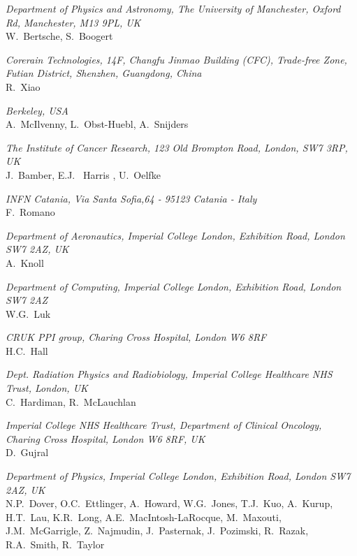 \vspace{0.5cm}
\noindent \textit{Department of Physics and Astronomy, The University of Manchester, Oxford Rd, Manchester, M13 9PL, UK} \\
W.~Bertsche, S.~Boogert
 
\vspace{0.5cm}
\noindent \textit{Corerain Technologies, 14F, Changfu Jinmao Building (CFC), Trade-free Zone, Futian District, Shenzhen, Guangdong, China} \\
R.~Xiao
 
\vspace{0.5cm}
\noindent \textit{Berkeley, USA} \\
A.~McIlvenny, L.~Obst-Huebl, A.~Snijders
 
\vspace{0.5cm}
\noindent \textit{The Institute of Cancer Research, 123 Old Brompton Road, London, SW7 3RP, UK} \\
J.~Bamber, E.J. ~Harris , U.~Oelfke
 
\vspace{0.5cm}
\noindent \textit{INFN Catania, Via Santa Sofia,64 - 95123 Catania - Italy} \\
F.~Romano
 
\vspace{0.5cm}
\noindent \textit{Department of Aeronautics, Imperial College London, Exhibition Road, London SW7 2AZ, UK} \\
A.~Knoll
 
\vspace{0.5cm}
\noindent \textit{Department of Computing, Imperial College London, Exhibition Road, London SW7 2AZ} \\
W.G.~Luk
 
\vspace{0.5cm}
\noindent \textit{CRUK PPI group, Charing Cross Hospital, London W6 8RF} \\
H.C.~Hall
 
\vspace{0.5cm}
\noindent \textit{Dept. Radiation Physics and Radiobiology, Imperial College Healthcare NHS Trust, London, UK} \\
C.~Hardiman, R.~McLauchlan
 
\vspace{0.5cm}
\noindent \textit{Imperial College NHS Healthcare Trust, Department of Clinical Oncology, Charing Cross Hospital, London W6 8RF, UK} \\
D.~Gujral
 
\vspace{0.5cm}
\noindent \textit{Department of Physics, Imperial College London, Exhibition Road, London SW7 2AZ, UK} \\
N.P.~Dover, O.C.~Ettlinger, A.~Howard, W.G.~Jones, T.J.~Kuo, A.~Kurup, H.T.~Lau, K.R.~Long, A.E.~MacIntosh-LaRocque, M.~Maxouti, J.M.~McGarrigle, Z.~Najmudin, J.~Pasternak, J.~Pozimski, R.~Razak, R.A.~Smith, R.~Taylor
 
